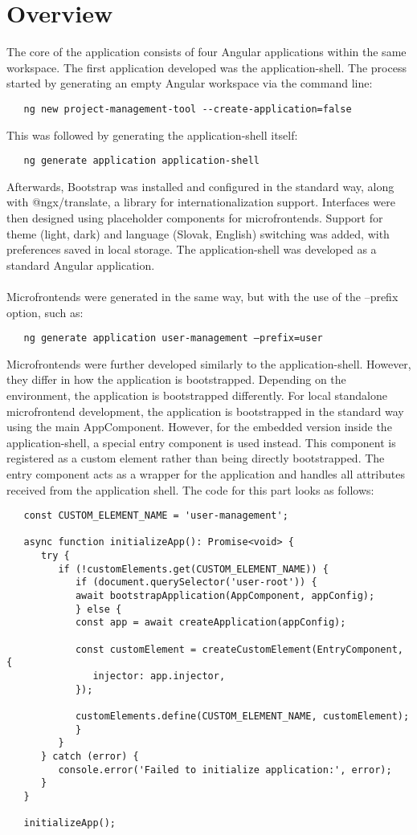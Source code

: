 \section{Overview}
The core of the application consists of four Angular applications within the same workspace. The first application developed was the application-shell. The process started by generating an empty Angular workspace via the command line:
\begin{verbatim}
   ng new project-management-tool --create-application=false
\end{verbatim}
This was followed by generating the application-shell itself:
\begin{verbatim}
   ng generate application application-shell
\end{verbatim}
Afterwards, Bootstrap was installed and configured in the standard way, along with @ngx/translate, a library for internationalization support. Interfaces were then designed using placeholder components for microfrontends. Support for theme (light, dark) and language (Slovak, English) switching was added, with preferences saved in local storage. The application-shell was developed as a standard Angular application. \\\\

\noindent
Microfrontends were generated in the same way, but with the use of the --prefix option, such as:
\begin{verbatim}
   ng generate application user-management –prefix=user
\end{verbatim}
Microfrontends were further developed similarly to the application-shell. However, they differ in how the application is bootstrapped. Depending on the environment, the application is bootstrapped differently. For local standalone microfrontend development, the application is bootstrapped in the standard way using the main AppComponent. However, for the embedded version inside the application-shell, a special entry component is used instead. This component is registered as a custom element rather than being directly bootstrapped. The entry component acts as a wrapper for the application and handles all attributes received from the application shell. The code for this part looks as follows:
\begin{verbatim}
   const CUSTOM_ELEMENT_NAME = 'user-management';

   async function initializeApp(): Promise<void> {
      try {
         if (!customElements.get(CUSTOM_ELEMENT_NAME)) {
            if (document.querySelector('user-root')) {
            await bootstrapApplication(AppComponent, appConfig);
            } else {
            const app = await createApplication(appConfig);

            const customElement = createCustomElement(EntryComponent, {
               injector: app.injector,
            });

            customElements.define(CUSTOM_ELEMENT_NAME, customElement);
            }
         }
      } catch (error) {
         console.error('Failed to initialize application:', error);
      }
   }

   initializeApp();
\end{verbatim}

